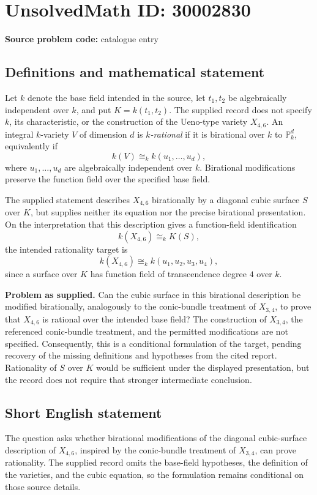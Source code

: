 \documentclass[11pt]{article}
\newcommand{\PP}{\mathbb{P}}
\begin{document}
\section*{UnsolvedMath ID: 30002830}
\textbf{Source problem code:} catalogue entry
\subsection{Definitions and mathematical statement}
Let \(k\) denote the base field intended in the source, let \(t_1,t_2\) be algebraically independent over \(k\), and put \(K=k(t_1,t_2)\). The supplied record does not specify \(k\), its characteristic, or the construction of the Ueno-type variety \(X_{4,6}\). An integral \(k\)-variety \(V\) of dimension \(d\) is \emph{\(k\)-rational} if it is birational over \(k\) to \(\PP^d_k\), equivalently if
\[
 k(V)\cong_k k(u_1,\ldots,u_d),
\]
where \(u_1,\ldots,u_d\) are algebraically independent over \(k\). Birational modifications preserve the function field over the specified base field.

The supplied statement describes \(X_{4,6}\) birationally by a diagonal cubic surface \(S\) over \(K\), but supplies neither its equation nor the precise birational presentation. On the interpretation that this description gives a function-field identification
\[
 k(X_{4,6})\cong_k K(S),
\]
the intended rationality target is
\[
 k(X_{4,6})\cong_k k(u_1,u_2,u_3,u_4),
\]
since a surface over \(K\) has function field of transcendence degree \(4\) over \(k\).

\textbf{Problem as supplied.} Can the cubic surface in this birational description be modified birationally, analogously to the conic-bundle treatment of \(X_{3,4}\), to prove that \(X_{4,6}\) is rational over the intended base field? The construction of \(X_{3,4}\), the referenced conic-bundle treatment, and the permitted modifications are not specified. Consequently, this is a conditional formulation of the target, pending recovery of the missing definitions and hypotheses from the cited report. Rationality of \(S\) over \(K\) would be sufficient under the displayed presentation, but the record does not require that stronger intermediate conclusion.
\subsection{Short English statement}
The question asks whether birational modifications of the diagonal cubic-surface description of \(X_{4,6}\), inspired by the conic-bundle treatment of \(X_{3,4}\), can prove rationality. The supplied record omits the base-field hypotheses, the definition of the varieties, and the cubic equation, so the formulation remains conditional on those source details.
\end{document}

